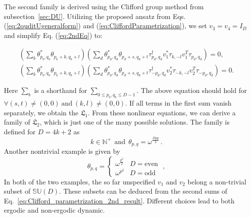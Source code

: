 \documentclass[aps,prx,twocolumn,notitlepage,nofootinbib,nobalancelastpage]{revtex4-2}
\theoremstyle{break}
\newcommand{\1}{\mathbbm{1}}
\theoremstyle{plain}
\theoremstyle{plain}
\theoremstyle{plain}
\begin{document}
The second family is derived using the Clifford group method from subsection~\ref{sec:DU}. Utilizing the proposed ansatz from Eqs. (\ref{eq:2quditUgeneralform}) and (\ref{eq:CliffordParametrization}), we set $v_3=v_4=I_D$ and simplify Eq. (\ref{eq:2ndEq}) to: 
\begin{widetext}
\begin{equation}
\begin{aligned}(\sum_{b}\theta_{p_{b},q_{b}}^{*}\theta_{p_{b}+k,q_{b}+l})(\sum_{d}\theta_{p_{d},q_{d}}^{*}\theta_{p_{d}+s,q_{d}+t}\tau_{p_{d},q_{d}}^{\dagger}v_{1}^{*}\tau_{k,-l}v_{1}^{T}\tau_{p_{d},q_{d}})=0,\ \\
(\sum_{b}\theta_{p_{b},q_{b}}^{*}\theta_{p_{b}+k,q_{b}+l})(\sum_{d}\theta_{p_{d},q_{d}}^{*}\theta_{p_{d}+s,q_{d}+t}\tau_{-p_{d},q_{d}}^{\dagger}v_{2}^{*}\tau_{-k,-l}v_{2}^{T}\tau_{-p_{d},q_{d}})=0.
\end{aligned}\label{eq:Clifford_parametrization_2nd_result}
\end{equation}
\end{widetext}
Here $\sum_b$ is a shorthand for $\sum_{0\leq p_b,q_b\leq D-1}$. %
The above equation should hold for $\forall(s,t)\neq(0,0)\ \mathrm{and}\ (k,l)\neq(0,0)$. If all terms in the first sum vanish separately, we obtain the $\mathfrak{L}_1$. 
From these nonlinear equations, we can derive a family of $\overline{\mathfrak{L}}_2$, which is just one of the many possible solutions.
The family is defined for $ D=4k+2$ as
\begin{equation}
 k\in\mathbb{N}^{+}\, \; \mathrm{ and }\,\; \theta_{p,q}=\omega^{\frac{Dpq}{2}} \, .
    \label{eq:simplest_2nd_Hierarchy_case}
\end{equation}
Another nontrivial example is given by 
\begin{equation}
\theta_{p,q}=\begin{cases}
\omega^{\frac{p^{2}}{2}} & D=\mathrm{even}\\
\omega^{p^{2}} & D=\mathrm{odd}
\end{cases}\; ,\end{equation}
In both of the two examples, the so far unspecified $v_1$ and $v_2$ belong a non-trivial subset of $\mathbb{SU}(D)$. These subsets can be deduced from the second sums of Eq.~\eqref{eq:Clifford_parametrization_2nd_result}. Different choices lead to both ergodic and non-ergodic dynamic.
\end{document}
